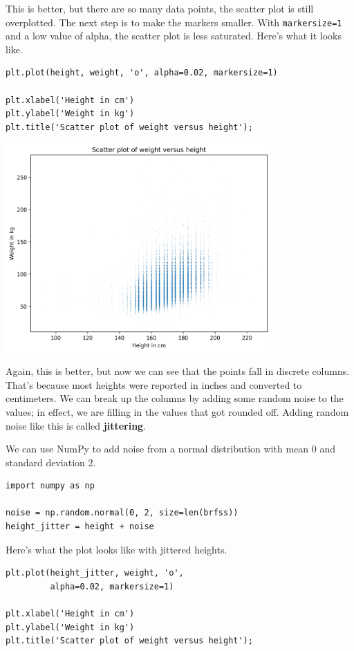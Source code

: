 This is better, but there are so many data points, the scatter plot is
still overplotted. The next step is to make the markers smaller. With
\passthrough{\lstinline!markersize=1!} and a low value of alpha, the
scatter plot is less saturated. Here's what it looks like.

\begin{lstlisting}[]
plt.plot(height, weight, 'o', alpha=0.02, markersize=1)

plt.xlabel('Height in cm')
plt.ylabel('Weight in kg')
plt.title('Scatter plot of weight versus height');
\end{lstlisting}

\begin{center}
\includegraphics[width=4in]{chapters/09_relationships_files/09_relationships_16_0.png}
\end{center}

Again, this is better, but now we can see that the points fall in
discrete columns. That's because most heights were reported in inches
and converted to centimeters. We can break up the columns by adding some
random noise to the values; in effect, we are filling in the values that
got rounded off. Adding random noise like this is called
\textbf{jittering}.

We can use NumPy to add noise from a normal distribution with mean 0 and
standard deviation 2.

\begin{lstlisting}[]
import numpy as np

noise = np.random.normal(0, 2, size=len(brfss))
height_jitter = height + noise
\end{lstlisting}

Here's what the plot looks like with jittered heights.

\begin{lstlisting}[]
plt.plot(height_jitter, weight, 'o', 
         alpha=0.02, markersize=1)

plt.xlabel('Height in cm')
plt.ylabel('Weight in kg')
plt.title('Scatter plot of weight versus height');
\end{lstlisting}

